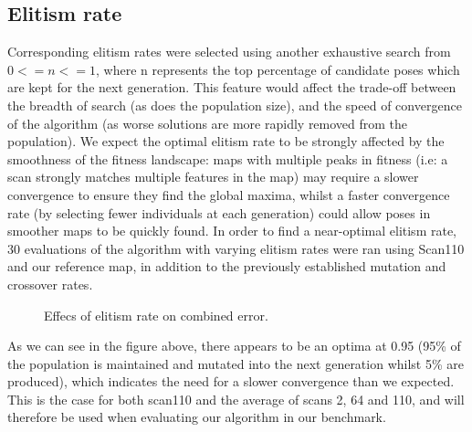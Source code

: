 \documentclass[authoryearcitations]{UoYCSproject}
\begin{document}
\subsection{Elitism rate}
\label{subsec:elite_elitism_rate}
Corresponding elitism rates were selected using another exhaustive search from $0 <= n <= 1$, where n represents the top percentage of candidate poses which are kept for the next generation. This feature would affect the trade-off between the breadth of search (as does the population size), and the speed of convergence of the algorithm (as worse solutions are more rapidly removed from the population). We expect the optimal elitism rate to be strongly affected by the smoothness of the fitness landscape: maps with multiple peaks in fitness (i.e: a scan strongly matches multiple features in the map) may require a slower convergence to ensure they find the global maxima, whilst a faster convergence rate (by selecting fewer individuals at each generation) could allow poses in smoother maps to be quickly found. In order to find a near-optimal elitism rate, 30 evaluations of the algorithm with varying elitism rates were ran using Scan110 and our reference map, in addition to the previously established mutation and crossover rates.

\begin{figure}
	\centering
	\caption[Optimsing elitism rate for scan/map]{Effecs of elitism rate on combined error.}
	\label{fig:elitsm_rates}
\end{figure}
As we can see in the figure above, there appears to be an optima at 0.95 (95\% of the population is maintained and mutated into the next generation whilst 5\% are produced), which indicates the need for a slower convergence than we expected. This is the case for both scan110 and the average of scans 2, 64 and 110, and will therefore be used when evaluating our algorithm in our benchmark.
\end{document}
